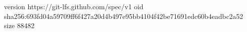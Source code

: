 version https://git-lfs.github.com/spec/v1
oid sha256:693fd04a59709ff6f427a20d4b497e95bb4104f42be71691edc60b4eadbc2a52
size 88482
